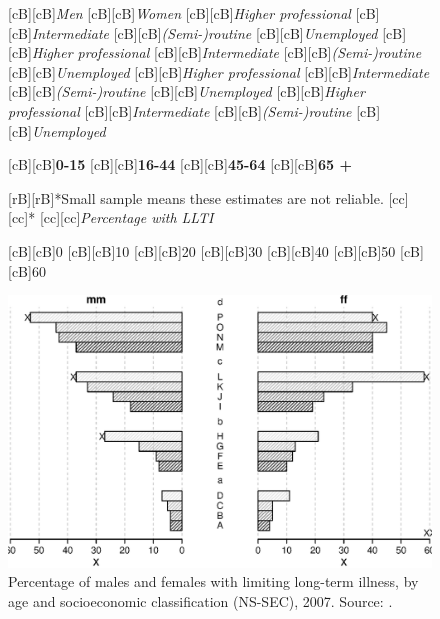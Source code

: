 \documentclass[11 pt, a4paper]{report}
\begin{document}
\begin{figure}[hbtp!]

[cB][cB]{\emph{Men}}
[cB][cB]{\emph{Women}}
[cB][cB]{\scriptsize{\emph{Higher professional}}}
[cB][cB]{\scriptsize{\emph{Intermediate}}}
[cB][cB]{\scriptsize{\emph{(Semi-)routine}}}
[cB][cB]{\scriptsize{\emph{Unemployed}}}
[cB][cB]{\scriptsize{\emph{Higher professional}}}
[cB][cB]{\scriptsize{\emph{Intermediate}}}
[cB][cB]{\scriptsize{\emph{(Semi-)routine}}}
[cB][cB]{\scriptsize{\emph{Unemployed}}}
[cB][cB]{\scriptsize{\emph{Higher professional}}}
[cB][cB]{\scriptsize{\emph{Intermediate}}}
[cB][cB]{\scriptsize{\emph{(Semi-)routine}}}
[cB][cB]{\scriptsize{\emph{Unemployed}}}
[cB][cB]{\scriptsize{\emph{Higher professional}}}
[cB][cB]{\scriptsize{\emph{Intermediate}}}
[cB][cB]{\scriptsize{\emph{(Semi-)routine}}}
[cB][cB]{\scriptsize{\emph{Unemployed}}}

[cB][cB]{\scriptsize{\textbf{0-15}}}
[cB][cB]{\scriptsize{\textbf{16-44}}}
[cB][cB]{\scriptsize{\textbf{45-64}}}
[cB][cB]{\scriptsize{\textbf{65 +}}}

[rB][rB]{\tiny{*Small sample means these estimates are not reliable.}}
[cc][cc]{\tiny{*}}
[cc][cc]{\scriptsize{\emph{Percentage with LLTI}}}

[cB][cB]{\small{0}}
[cB][cB]{\small{10}}
[cB][cB]{\small{20}}
[cB][cB]{\small{30}}
[cB][cB]{\small{40}}
[cB][cB]{\small{50}}
[cB][cB]{\small{60}}

\includegraphics[width=\textwidth]{../figures/Fig8.7.eps}

\caption{Percentage of males and females with limiting long-term illness, by age and socioeconomic classification (NS-SEC), 2007. Source: \citet{ONS2013a}.}\label{Fig:N07} %
\end{figure}
\end{document}
